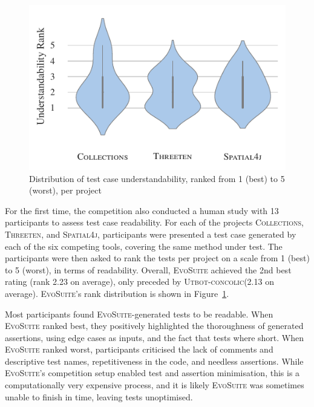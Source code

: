 \documentclass[10pt,conference]{IEEEtran}
\newcommand{\project}[1]{\textsc{#1}\xspace}
\newcommand{\Collections}{\project{Collections}}
\newcommand{\Threeten}{\project{Threeten}}
\newcommand{\Spatial}{\project{Spatial4j}}
\newcommand{\EVOSUITE}{\textsc{EvoSuite}\xspace}
\newcommand{\UtbotConcolic}{\textsc{Utbot-concolic}\xspace}
\begin{document}



\begin{figure}
  \includegraphics[width=\columnwidth]{./data/understandability}
  \caption{Distribution of test case understandability, ranked from 1 (best) to 5 (worst), per project}
  \label{fig:readability}
\end{figure}

For the first time, the competition also conducted a human study with 13
participants to assess test case readability. For each of the projects \Collections,
\Threeten, and \Spatial, participants were presented a test case
generated by each of the six competing tools, covering the same method under
test. The participants were then asked to rank the tests per project
on a scale from 1 (best) to 5 (worst), in terms of readability. Overall,
\EVOSUITE achieved the 2nd best rating (rank 2.23 on average), only
preceded by \UtbotConcolic (2.13 on average). \EVOSUITE's rank distribution
is shown in Figure~\ref{fig:readability}.

Most participants found \EVOSUITE-generated tests to be readable. When
\EVOSUITE ranked best, they positively highlighted the thoroughness of
generated assertions, using edge cases as inputs, and the fact that tests
where short. When \EVOSUITE ranked worst, participants criticised the lack
of comments and descriptive test names, repetitiveness in the code, and
needless assertions. While \EVOSUITE's competition setup enabled test and
assertion minimisation, this is a computationally very expensive process,
and it is likely \EVOSUITE was sometimes unable to finish in time,
leaving tests unoptimised.
\end{document}
